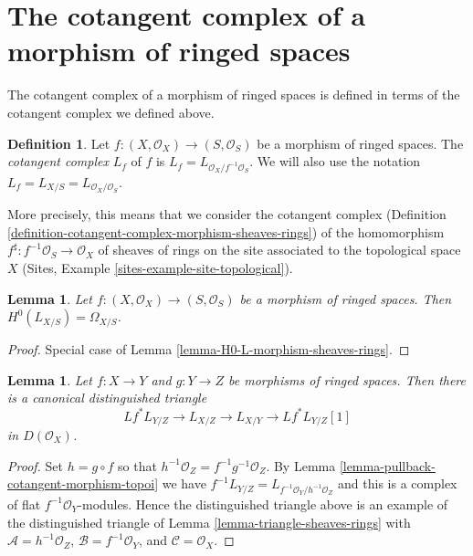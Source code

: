 \documentclass{stacks-project}
\theoremstyle{plain}
\newtheorem{lemma}[subsection]{Lemma}
\theoremstyle{definition}
\newtheorem{definition}[subsection]{Definition}
\theoremstyle{remark}
\numberwithin{equation}{subsection}
\begin{document}
\section{The cotangent complex of a morphism of ringed spaces}
\label{section-cotangent-morphism-ringed-spaces}

\noindent
The cotangent complex of a morphism of ringed spaces is defined
in terms of the cotangent complex we defined above.

\begin{definition}
\label{definition-cotangent-complex-morphism-ringed-spaces}
Let $f : (X, \mathcal{O}_X) \to (S, \mathcal{O}_S)$ be a morphism of
ringed spaces. The {\it cotangent complex} $L_f$ of $f$ is
$L_f = L_{\mathcal{O}_X/f^{-1}\mathcal{O}_S}$.
We will also use the notation
$L_f = L_{X/S} = L_{\mathcal{O}_X/\mathcal{O}_S}$.
\end{definition}

\noindent
More precisely, this means that we consider the cotangent complex
(Definition \ref{definition-cotangent-complex-morphism-sheaves-rings})
of the homomorphism $f^\sharp : f^{-1}\mathcal{O}_S \to \mathcal{O}_X$
of sheaves of rings on the site associated to the topological space $X$
(Sites, Example \ref{sites-example-site-topological}).

\begin{lemma}
\label{lemma-H0-L-morphism-ringed-spaces}
Let $f : (X, \mathcal{O}_X) \to (S, \mathcal{O}_S)$ be a morphism of
ringed spaces. Then $H^0(L_{X/S}) = \Omega_{X/S}$.
\end{lemma}

\begin{proof}
Special case of Lemma \ref{lemma-H0-L-morphism-sheaves-rings}.
\end{proof}

\begin{lemma}
\label{lemma-triangle-ringed-spaces}
Let $f : X \to Y$ and $g : Y \to Z$ be morphisms of ringed spaces.
Then there is a canonical distinguished triangle
$$
Lf^* L_{Y/Z} \to L_{X/Z} \to L_{X/Y} \to Lf^*L_{Y/Z}[1]
$$
in $D(\mathcal{O}_X)$.
\end{lemma}

\begin{proof}
Set $h = g \circ f$ so that $h^{-1}\mathcal{O}_Z = f^{-1}g^{-1}\mathcal{O}_Z$.
By Lemma \ref{lemma-pullback-cotangent-morphism-topoi} we have
$f^{-1}L_{Y/Z} = L_{f^{-1}\mathcal{O}_Y/h^{-1}\mathcal{O}_Z}$
and this is a complex of flat $f^{-1}\mathcal{O}_Y$-modules.
Hence the distinguished triangle above is an example of the
distinguished triangle of
Lemma \ref{lemma-triangle-sheaves-rings}
with $\mathcal{A} = h^{-1}\mathcal{O}_Z$, $\mathcal{B} = f^{-1}\mathcal{O}_Y$,
and $\mathcal{C} = \mathcal{O}_X$.
\end{proof}
\end{document}
